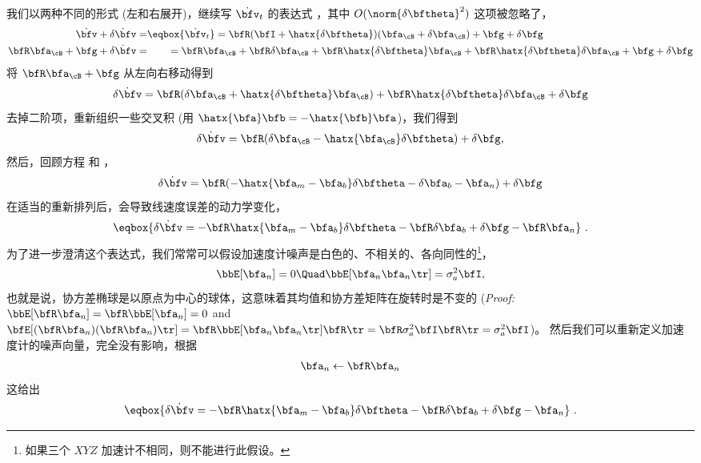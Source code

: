 我们以两种不同的形式 (左和右展开)，继续写 $\dot\bfv_t$ 的表达式  ，其中 $O(\norm{\delta\bftheta}^2)$ 这项被忽略了，
%
%
\begin{align*}
\dot\bfv+\dot{\delta\bfv} =& \eqbox{\dot\bfv_t} = \bfR(\bfI+\hatx{\delta\bftheta})(\bfa_\cB+\delta\bfa_\cB)+\bfg + \delta\bfg \\
\bfR\bfa_\cB+\bfg+\dot{\delta\bfv} =&~~~~~~= \bfR\bfa_\cB+\bfR\delta\bfa_\cB+\bfR\hatx{\delta\bftheta}\bfa_\cB+\bfR\hatx{\delta\bftheta}\delta\bfa_\cB+\bfg+\delta\bfg 
\end{align*}%
%
将 $\bfR\bfa_\cB+\bfg$ 从左向右移动得到
%
\begin{equation}
\dot{\delta\bfv} = \bfR(\delta\bfa_\cB+\hatx{\delta\bftheta}\bfa_\cB) + \bfR\hatx{\delta\bftheta}\delta\bfa_\cB + \delta\bfg
\end{equation}%
%
去掉二阶项，重新组织一些交叉积 (用 $\hatx{\bfa}\bfb=-\hatx{\bfb}\bfa$)，我们得到
%
\begin{equation}
\dot{\delta\bfv} = \bfR(\delta\bfa_\cB - \hatx{\bfa_\cB}\delta\bftheta) + \delta\bfg,
\end{equation}%
%
然后，回顾方程  和 ，
%
\begin{equation}
{\dot{\delta\bfv} = \bfR(-\hatx{\bfa_m-\bfa_b}\delta\bftheta - \delta\bfa_b - \bfa_n) + \delta\bfg}
\end{equation}%
%
在适当的重新排列后，会导致线速度误差的动力学变化，
%
\begin{equation}
\eqbox{\dot{\delta\bfv} = -\bfR\hatx{\bfa_m-\bfa_b}\delta\bftheta - \bfR\delta\bfa_b + \delta\bfg - \bfR\bfa_n}\ .
\end{equation}%
%
为了进一步澄清这个表达式，我们常常可以假设加速度计噪声是白色的、不相关的、各向同性的\footnote{如果三个 $XYZ$ 加速计不相同，则不能进行此假设。}，
%
\begin{equation}
\bbE[\bfa_n] = 0 \Quad \bbE[\bfa_n\bfa_n\tr]=\sigma_a^2\bfI,
\end{equation}%
%
也就是说，协方差椭球是以原点为中心的球体，这意味着其均值和协方差矩阵在旋转时是不变的 (\emph{Proof:} $\bbE[\bfR\bfa_n] = \bfR\bbE[\bfa_n] = 0$ and $\bfE[(\bfR\bfa_n)(\bfR\bfa_n)\tr] = \bfR\bbE[\bfa_n\bfa_n\tr]\bfR\tr = \bfR\sigma_a^2\bfI\bfR\tr = \sigma_a^2\bfI$)。
然后我们可以重新定义加速度计的噪声向量，完全没有影响，根据
%
\begin{equation}
\bfa_n \gets \bfR\bfa_n
\end{equation}%
%
这给出
%
\begin{equation}
\eqbox{\dot{\delta\bfv} = -\bfR\hatx{\bfa_m-\bfa_b}\delta\bftheta - \bfR\delta\bfa_b + \delta\bfg - \bfa_n}\ .
\end{equation}%



